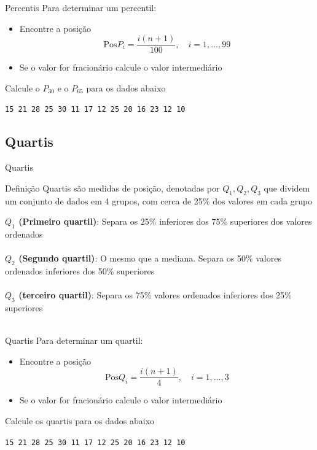 \documentclass[10pt]{beamer}\usepackage[]{graphicx}\usepackage[]{color}
\theoremstyle{definition}
\begin{document}
\begin{frame}[fragile]{Percentis}
  Para determinar um percentil:
  \begin{itemize}
  \item Encontre a posição
    \begin{equation*}
      \text{Pos} P_i = \frac{i(n+1)}{100}, \quad i=1,\ldots,99
    \end{equation*}
  \item Se o valor for fracionário calcule o valor intermediário
  \end{itemize}
  Calcule o $P_{30}$ e o $P_{65}$ para os dados abaixo
  \begin{center}
    \texttt{15 21 28 25 30 11 17 12 25 20 16 23 12 10}
  \end{center}

\end{frame}

\subsection{Quartis}

\begin{frame}{Quartis}
  \begin{block}{Definição}
    Quartis são medidas de posição, denotadas por $Q_1, Q_2, Q_3$
    que dividem um conjunto de dados em 4 grupos, com cerca de 25\% dos
    valores em cada grupo
  \end{block}
  \textbf{$Q_1$ (Primeiro quartil)}: Separa os 25\% inferiores dos 75\%
  superiores dos valores ordenados\\~\\
  \textbf{$Q_2$ (Segundo quartil)}: O mesmo que a mediana. Separa os
  50\% valores ordenados inferiores dos 50\% superiores\\~\\
  \textbf{$Q_3$ (terceiro quartil)}: Separa os 75\% valores ordenados
  inferiores dos 25\% superiores\\~\\
\end{frame}

\begin{frame}{Quartis}
  Para determinar um quartil:
  \begin{itemize}
  \item Encontre a posição
    \begin{equation*}
      \text{Pos} Q_i = \frac{i(n+1)}{4}, \quad i=1,\ldots,3
    \end{equation*}
  \item Se o valor for fracionário calcule o valor intermediário
  \end{itemize}
  Calcule os quartis para os dados abaixo
  \begin{center}
    \texttt{15 21 28 25 30 11 17 12 25 20 16 23 12 10}
  \end{center}

\end{frame}
\end{document}
